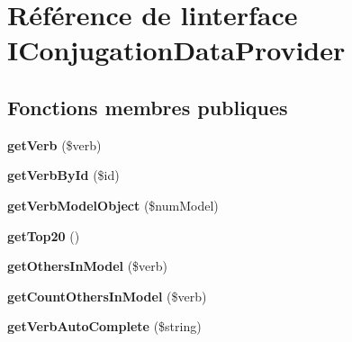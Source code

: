 \hypertarget{interfaceIConjugationDataProvider}{}\section{Référence de l\textquotesingle{}interface I\+Conjugation\+Data\+Provider}
\label{interfaceIConjugationDataProvider}
\subsection*{Fonctions membres publiques}
\begin{DoxyCompactItemize}
\item 
\hypertarget{interfaceIConjugationDataProvider_a528f3344f0463077e305886ebcc031a6}{}\label{interfaceIConjugationDataProvider_a528f3344f0463077e305886ebcc031a6} 
{\bfseries get\+Verb} (\$verb)
\item 
\hypertarget{interfaceIConjugationDataProvider_a60a3d72a92a67f89a93b8396ea5edd0d}{}\label{interfaceIConjugationDataProvider_a60a3d72a92a67f89a93b8396ea5edd0d} 
{\bfseries get\+Verb\+By\+Id} (\$id)
\item 
\hypertarget{interfaceIConjugationDataProvider_abdf3d3ed8eb4045b80461a880c0a3e24}{}\label{interfaceIConjugationDataProvider_abdf3d3ed8eb4045b80461a880c0a3e24} 
{\bfseries get\+Verb\+Model\+Object} (\$num\+Model)
\item 
\hypertarget{interfaceIConjugationDataProvider_a96c98a3a99a79c0a4228a585c5294576}{}\label{interfaceIConjugationDataProvider_a96c98a3a99a79c0a4228a585c5294576} 
{\bfseries get\+Top20} ()
\item 
\hypertarget{interfaceIConjugationDataProvider_a5c7f6041f670ef5560f72577f5f25867}{}\label{interfaceIConjugationDataProvider_a5c7f6041f670ef5560f72577f5f25867} 
{\bfseries get\+Others\+In\+Model} (\$verb)
\item 
\hypertarget{interfaceIConjugationDataProvider_a62018b8fae6510989ebcb9c974958586}{}\label{interfaceIConjugationDataProvider_a62018b8fae6510989ebcb9c974958586} 
{\bfseries get\+Count\+Others\+In\+Model} (\$verb)
\item 
\hypertarget{interfaceIConjugationDataProvider_abc704f44a3eaec66a9d2461c9be1240b}{}\label{interfaceIConjugationDataProvider_abc704f44a3eaec66a9d2461c9be1240b} 
{\bfseries get\+Verb\+Auto\+Complete} (\$string)
\item 
\hypertarget{interfaceIConjugationDataProvider_a254299b72e84b00aec82d4037d484666}{}\label{interfaceIConjugationDataProvider_a254299b72e84b00aec82d4037d484666} 

\end{DoxyCompactItemize}
